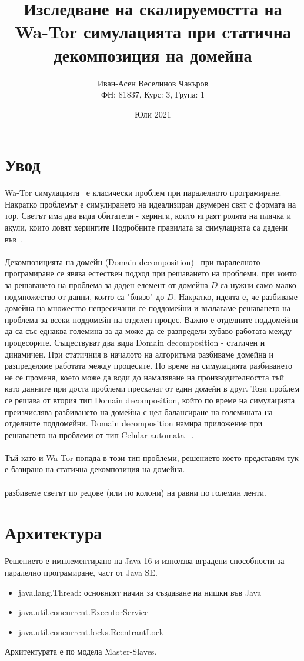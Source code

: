 \documentclass{article}
\title{Изследване на скалируемостта на Wa-Tor симулацията при cтатична декомпозиция на домейна}
\author{Иван-Асен Веселинов Чакъров \\
	ФН: 81837, Курс: 3, Група: 1}
\date{Юли 2021}
\begin{document}
\maketitle

\section{Увод}
Wa-Tor симулацията~\cite{wator} е класически проблем при паралелното програмиране.
Накратко проблемът е симулирането на идеализиран двумерен свят с формата на тор.
Светът има два вида обитатели - херинги, които играят ролята на плячка и акули, които ловят херингите
Подробните правилата за симулацията са дадени във~\cite{wator}.
\\
\\
Декомпозицията на домейн (Domain decomposition)~\cite{domain_decomposition}
при паралелното програмиране се явява естествен подход при решаването на проблеми,
при които за решаването на проблема за даден елемент от домейна $D$ са нужни само малко подмножество от данни,
които са "близо" до $D$. Накратко, идеята е, че разбиваме домейна на множество
непресичащи се поддомейни и възлагаме решаването на проблема за всеки поддомейн на
отделен процес. Важно е отделните поддомейни да са със еднаква големина за да може да се разпредели
хубаво работата между процесорите. Съществуват два вида Domain decomposition - статичен и динамичен.
При статичния в началото на алгоритъма разбиваме домейна и разпределяме работата между процесите.
По време на симулацията разбиването не се променя, което може да води до намаляване на производителността
тъй като данните при доста проблеми прескачат от един домейн в друг.
Този проблем се решава от втория тип Domain decomposition, който по време на симулацията
преизчислява разбиването на домейна с цел балансиране на големината на отделните поддомейни.
Domain decomposition намира приложение при решаването на проблеми от тип
Celular automata ~\cite{celular_automata}.
\\
\\
Тъй като и Wa-Tor попада в този тип проблеми, решението което представям тук е базирано
на статична декомпозиция на домейна.
\\
\\
разбивеме светът по редове (или по колони) на равни по големин ленти.

\section{Архитектура}
Решението е имплементирано на Java 16 и използва вградени способности за паралелно програмиране,
част от Java SE.
\begin{itemize}
	\item java.lang.Thread: основният начин за създаване на нишки във Java
	\item java.util.concurrent.ExecutorService
	\item java.util.concurrent.locks.ReentrantLock
\end{itemize}
Архитектурата е по модела Master-Slaves.
\end{document}
